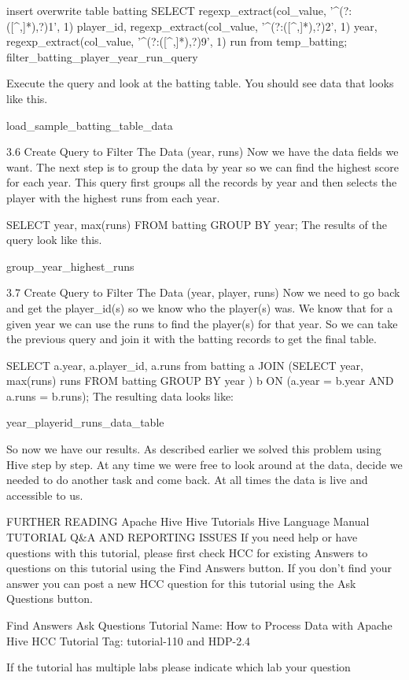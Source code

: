 insert overwrite table batting  
SELECT  
  regexp_extract(col_value, '^(?:([^,]*),?){1}', 1) player_id,  
  regexp_extract(col_value, '^(?:([^,]*),?){2}', 1) year,  
  regexp_extract(col_value, '^(?:([^,]*),?){9}', 1) run  
from temp_batting;
filter_batting_player_year_run_query

Execute the query and look at the batting table. You should see data that looks like this.

load_sample_batting_table_data

3.6 Create Query to Filter The Data (year, runs)
Now we have the data fields we want. The next step is to group the data by year so we can find the highest score for each year. This query first groups all the records by year and then selects the player with the highest runs from each year.

SELECT year, max(runs) FROM batting GROUP BY year;
The results of the query look like this.

group_year_highest_runs

3.7 Create Query to Filter The Data (year, player, runs)
Now we need to go back and get the player_id(s) so we know who the player(s) was. We know that for a given year we can use the runs to find the player(s) for that year. So we can take the previous query and join it with the batting records to get the final table.

SELECT a.year, a.player_id, a.runs from batting a  
JOIN (SELECT year, max(runs) runs FROM batting GROUP BY year ) b  
ON (a.year = b.year AND a.runs = b.runs);
The resulting data looks like:

year_playerid_runs_data_table

So now we have our results. As described earlier we solved this problem using Hive step by step. At any time we were free to look around at the data, decide we needed to do another task and come back. At all times the data is live and accessible to us.

FURTHER READING
Apache Hive
Hive Tutorials
Hive Language Manual
TUTORIAL Q&A AND REPORTING ISSUES
If you need help or have questions with this tutorial, please first check HCC for existing Answers to questions on this tutorial using the Find Answers button. If you don’t find your answer you can post a new HCC question for this tutorial using the Ask Questions button.

Find Answers	Ask Questions
Tutorial Name: How to Process Data with Apache Hive
HCC Tutorial Tag: tutorial-110 and HDP-2.4

If the tutorial has multiple labs please indicate which lab your question 
